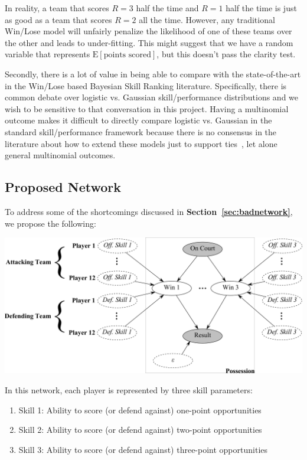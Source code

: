 \documentclass[10pt,twocolumn]{article}
\newcommand{\Elin}[1]{\ensuremath{     \mathrm{E}\left[ #1 \right]   }}
\begin{document}
In reality, a team that scores $R=3$ half the time and $R=1$ half the time is just as good as a team that scores $R=2$ all the time.
However, any traditional Win/Lose model will unfairly penalize the likelihood of one of these teams over the other and leads to under-fitting.
This might suggest that we have a random variable that represents $\Elin{\textrm{points scored}}$, but this doesn't pass the clarity test.



Secondly, there is a lot of value in being able to compare with the state-of-the-art in the Win/Lose based Bayesian Skill Ranking literature.
Specifically, there is common debate over logistic vs. Gaussian skill/performance distributions and we wish to be sensitive to that conversation in this project.
Having a multinomial outcome makes it difficult to directly compare logistic vs. Gaussian in the standard skill/performance framework because there is no consensus in the literature about how to extend these models just to support ties~\cite{hunter2004mm}, let alone general multinomial outcomes.

\subsection{Proposed Network}
\label{sec:goodnetwork}

To address some of the shortcomings discussed in {\bf Section~\ref{sec:badnetwork}}, we propose the following:
\begin{center}
	\includegraphics[width=1.05\linewidth]{figures/newnetwork}
\end{center}

In this network, each player is represented by three skill parameters:
\begin{enumerate}
\item Skill 1: Ability to score (or defend against) one-point opportunities
\item Skill 2: Ability to score (or defend against) two-point opportunities
\item Skill 3: Ability to score (or defend against) three-point opportunities
\end{enumerate}
\end{document}
